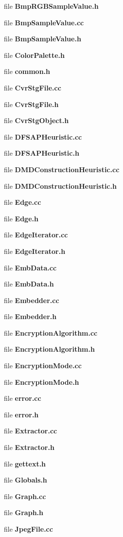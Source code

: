 \begin{DoxyCompactItemize}
file \textbf{ Bmp\+R\+G\+B\+Sample\+Value.\+h}
\item 
file \textbf{ Bmp\+Sample\+Value.\+cc}
\item 
file \textbf{ Bmp\+Sample\+Value.\+h}
\item 
file \textbf{ Color\+Palette.\+h}
\item 
file \textbf{ common.\+h}
\item 
file \textbf{ Cvr\+Stg\+File.\+cc}
\item 
file \textbf{ Cvr\+Stg\+File.\+h}
\item 
file \textbf{ Cvr\+Stg\+Object.\+h}
\item 
file \textbf{ D\+F\+S\+A\+P\+Heuristic.\+cc}
\item 
file \textbf{ D\+F\+S\+A\+P\+Heuristic.\+h}
\item 
file \textbf{ D\+M\+D\+Construction\+Heuristic.\+cc}
\item 
file \textbf{ D\+M\+D\+Construction\+Heuristic.\+h}
\item 
file \textbf{ Edge.\+cc}
\item 
file \textbf{ Edge.\+h}
\item 
file \textbf{ Edge\+Iterator.\+cc}
\item 
file \textbf{ Edge\+Iterator.\+h}
\item 
file \textbf{ Emb\+Data.\+cc}
\item 
file \textbf{ Emb\+Data.\+h}
\item 
file \textbf{ Embedder.\+cc}
\item 
file \textbf{ Embedder.\+h}
\item 
file \textbf{ Encryption\+Algorithm.\+cc}
\item 
file \textbf{ Encryption\+Algorithm.\+h}
\item 
file \textbf{ Encryption\+Mode.\+cc}
\item 
file \textbf{ Encryption\+Mode.\+h}
\item 
file \textbf{ error.\+cc}
\item 
file \textbf{ error.\+h}
\item 
file \textbf{ Extractor.\+cc}
\item 
file \textbf{ Extractor.\+h}
\item 
file \textbf{ gettext.\+h}
\item 
file \textbf{ Globals.\+h}
\item 
file \textbf{ Graph.\+cc}
\item 
file \textbf{ Graph.\+h}
\item 
file \textbf{ Jpeg\+File.\+cc}

\end{DoxyCompactItemize}
